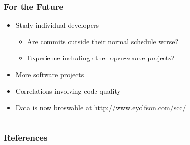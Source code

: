 \documentclass[aspectratio=169]{beamer}
\begin{document}
\begin{frame}
  \frametitle{For the Future}

  
  \begin{itemize}
    \item Study individual developers
   
    \begin{itemize}
      \item Are commits outside their normal schedule worse?

      \item Experience including other open-source projects?
    \end{itemize}

    \item More software projects

    \item Correlations involving code quality

    \item Data is now broswable at \url{http://www.eyolfson.com/scc/}
  \end{itemize}

\end{frame}

\section*{}
\begin{frame}[allowframebreaks]
  \frametitle{References}
  
  
\end{frame}
\end{document}
